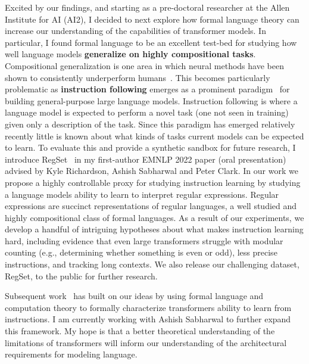 \documentclass[12pt]{article}
\begin{document}
Excited by our findings,
and starting as a pre-doctoral researcher at the Allen Institute for AI (AI2),
I decided to next explore how formal language theory 
can increase our understanding of the capabilities of transformer models.
In particular, I found formal language to be an excellent test-bed for
studying how well language models 
\textbf{generalize on highly compositional tasks}. 
Compositional generalization is one area in which 
neural methods have been shown 
to consistently underperform humans~\cite{Lake2018GeneralizationWS}.
This becomes particularly problematic 
as \textbf{instruction following} emerges 
as a prominent paradigm~\cite{mishra2021crosstask, Wei2021FinetunedLM}
for building general-purpose large language models. 
Instruction following is where a language model is expected to perform a novel task
(one not seen in training) given only a description of the task.
Since this paradigm has emerged relatively recently
little is known about what kinds of tasks current models can be expected to learn.
To evaluate this and provide a synthetic sandbox for future research,
I introduce RegSet~\cite{Finlayson2022WhatMI} in my first-author EMNLP 2022 paper 
(oral presentation) 
advised by Kyle Richardson, Ashish Sabharwal and Peter Clark. 
In our work we propose a highly controllable proxy for studying instruction learning
by studying a language models ability to learn to interpret regular expressions.
Regular expressions are succinct representations of regular languages, 
a well studied and highly compositional class of formal languages.
As a result of our experiments,
we develop a handful of intriguing hypotheses 
about what makes instruction learning hard, 
including evidence that even large transformers struggle with modular counting 
(e.g., determining whether something is even or odd), 
less precise instructions, and tracking long contexts. 
We also release our challenging dataset, RegSet, to the public for further research.

Subsequent work~\cite{Merrill2022LogPrecisionTA} 
has built on our ideas by using formal language and computation theory
to formally characterize transformers ability to learn from instructions.
I am currently working with Ashish Sabharwal 
to further expand this framework.
My hope is that a better theoretical understanding 
of the limitations of transformers will inform 
our understanding of the architectural requirements 
for modeling language.
\end{document}
